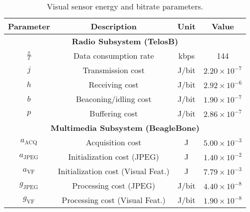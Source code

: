 \documentclass[twocolumn,english]{IEEEtran}
\providecommand{\tabularnewline}{\\}
\theoremstyle{plain}
\theoremstyle{definition}
\begin{document}
\begin{table}[t!]
\begin{centering}
\caption{Visual sensor energy and bitrate parameters.\label{tab:TelosB Settings}}

\par\end{centering}

\centering{}\begin{tabular}{|c|c|c|c|}
\hline 
\textbf{Parameter}  & \textbf{Description}  & \textbf{Unit}  & \textbf{Value }\tabularnewline
\hline 
\hline 
\multicolumn{4}{|c|}{\textbf{Radio Subsystem (TelosB)}}\tabularnewline
\hline 
\hline 
$\frac{s}{T}$  & Data consumption rate  & kbps  & 144\tabularnewline
\hline 
$j$  & Transmission cost  & J/bit  & $2.20\times10^{-7}$\tabularnewline
\hline 
$h$  & Receiving cost  & J/bit  & $2.92\times10^{-6}$\tabularnewline
\hline 
$b$  & Beaconing/idling cost  & J/bit  & $1.90\times10^{-7}$\tabularnewline
\hline 
$p$  & Buffering cost  & J/bit  & $2.86\times10^{-7}$\tabularnewline
\hline 
\hline 
\multicolumn{4}{|c|}{\textbf{Multimedia Subsystem (BeagleBone)}}\tabularnewline
\hline 
\hline 
$a_{\textrm{ACQ}}$  &  Acquisition cost  & J  & $5.00\times10^{-3}$\tabularnewline
\hline 
$a_{\textrm{JPEG}}$  & Initialization cost (JPEG)  & J  & $1.40\times10^{-2}$\tabularnewline
\hline 
$a_{\textrm{VF}}$  & Initialization cost (Visual Feat.) & J & $7.79\times10^{-3}$\tabularnewline
\hline 
$g_{\textrm{JPEG}}$  & Processing cost (JPEG)  & J/bit  & $4.40\times10^{-8}$\tabularnewline
\hline 
$g_{\textrm{VF}}$  & Processing cost (Visual Feat.)  & J/bit  & $1.90\times10^{-8}$\tabularnewline
\hline 
\end{tabular}
\end{table}
\end{document}
